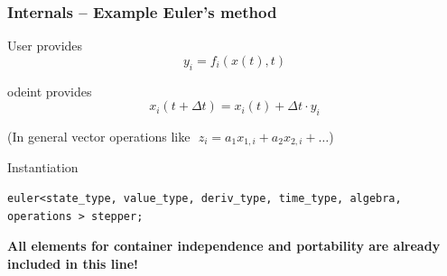 \begin{frame}[fragile]
  \frametitle{Internals -- Example Euler's method}

User provides 
  \begin{displaymath}
    y_i = f_i( x(t) , t ) %
  \end{displaymath}

odeint provides
  \begin{displaymath}
    x_i (t + \Delta t ) = x_i( t )  + \Delta t \cdot y_i
  \end{displaymath}

(In general vector operations like $\,\, z_i = a_1 x_{1,i} + a_2 x_{2,i} + \dots $)



\vspace{4ex}

Instantiation

\vspace{1ex}

\begin{lstlisting}[basicstyle=\small\ttfamily,escapechar=!]
euler<state_type, value_type, deriv_type, time_type, algebra, operations > stepper;
\end{lstlisting}

\vspace{1ex}

{\bf All elements for container independence and portability are already included in this line!}

\end{frame}

